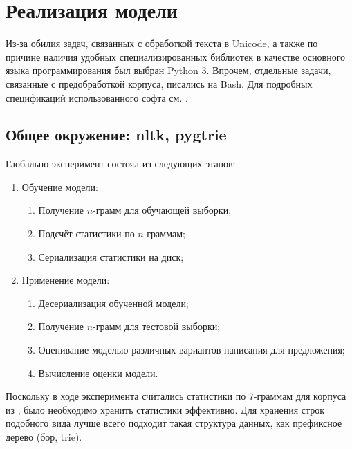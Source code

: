 
\section{ Реализация модели }\label{sec:coding}

Из-за обилия задач, связанных с обработкой текста в Unicode, а также по причине наличия удобных специализированных библиотек в качестве основного языка программирования был выбран Python 3. Впрочем, отдельные задачи, связанные с предобработкой корпуса, писались на Bash. Для подробных спецификаций использованного софта см. .

\subsection{ Общее окружение: nltk, pygtrie }

Глобально эксперимент состоял из следующих этапов:

\begin{enumerate}
	\item Обучение модели:
	
	\begin{enumerate}
		\item Получение $n$-грамм для обучающей выборки;
		
		\item Подсчёт статистики по $n$-граммам;
		
		\item Сериализация статистики на диск;
	\end{enumerate}
	
	\item Применение модели:
	\begin{enumerate}
		\item Десериализация обученной модели;
	
		\item Получение $n$-грамм для тестовой выборки;
	
		\item Оценивание моделью различных вариантов написания для предложения;
		
		\item Вычисление оценки модели.
	\end{enumerate}	
\end{enumerate}

Поскольку в ходе эксперимента считались статистики по 7-граммам для корпуса из , было необходимо хранить статистики эффективно. Для хранения строк подобного вида лучше всего подходит такая структура данных, как префиксное дерево (бор, trie).

